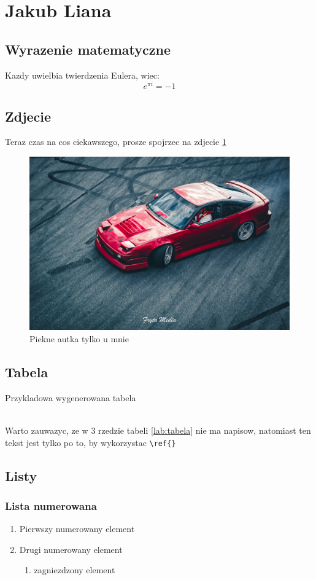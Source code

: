 \section{Jakub Liana}
\label{sec:Linas}

\subsection{Wyrazenie matematyczne}
    Kazdy uwielbia twierdzenia Eulera, wiec: \[e^{\pi i}=-1\]
\subsection{Zdjecie}
    Teraz czas na cos ciekawszego, prosze spojrzec na zdjecie \ref{fig:s13}
    \begin{figure}[h]
        \centering
        \includegraphics[width=1\textwidth]{pictures/s13.jpg}
        \caption{Piekne autka tylko u mnie}
        \label{fig:s13}
    \end{figure}
    \newpage
\subsection{Tabela}
    Przykladowa wygenerowana tabela
    
    \\Warto zauwazyc, ze w 3 rzedzie tabeli \ref{lab:tabela} nie ma napisow, natomiast ten tekst jest tylko po to, by wykorzystac \verb|\ref{}|
\subsection{Listy}
    \subsubsection{Lista numerowana}
        \begin{enumerate}
            \item Pierwszy numerowany element
            \item Drugi numerowany element
            \begin{enumerate}
                \item zagniezdzony element
            \end{enumerate}
        \end{enumerate}
